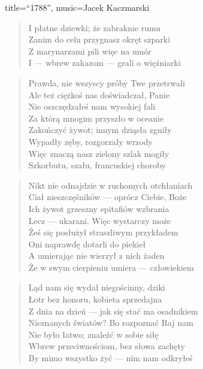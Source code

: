 \begin{song}{title={``1788''}, music={Jacek Kaczmarski}}
\begin{multicols}{2}
\begin{verse}
        I płatne dziewki; że zabraknie rumu \\
        Zanim do celu przygnasz okręt szparki \\
        Z marynarzami pili więc na umór \\
        I --- wbrew zakazom --- grali o więźniarki
    \end{verse}
    \vfill\null\columnbreak{}
    \begin{verse}
        Prawda, nie wszyscy próby Twe przetrwali \\
        Ale też ciężkoś nas doświadczał, Panie \\
        Nie oszczędzałeś nam wysokiej fali \\ 
        Za którą mnogim przyszło w oceanie \\
        Zakończyć żywot; innym dziąsła zgniły \\
        Wypadły zęby, rozgorzały wrzody \\ 
        Więc znaczą nasz zielony szlak mogiły \\
        Szkorbutu, szału, francuskiej choroby
    \end{verse}
    \begin{verse}
        Nikt nie odnajdzie w ruchomych otchłaniach \\
        Ciał nieszczęśników --- oprócz Ciebie, Boże \\
        Ich żywot grzeszny epitafiów wzbrania \\
        Lecz --- ukarani. Więc wystarczy może \\ 
        Żeś się posłużył straszliwym przykładem \\
        Oni naprawdę dotarli do piekieł \\
        A umierając nie wierzył z nich żaden \\
        Że w swym cierpieniu umiera --- człowiekiem
    \end{verse}
    \begin{verse}
        Ląd nam się wydał niegościnny, dziki \\
        Łotr bez honoru, kobieta sprzedajna \\
        Z dnia na dzień --- jak się stać ma osadnikiem \\
        Nieznanych światów? Bo rozpoznać Raj nam \\
        Nie było łatwo; znaleźć w sobie siłę \\
        Wbrew przeciwnościom, bez słowa zachęty \\
        By mimo wszystko żyć --- nim nam odkryłeś \\ 

\end{verse}
\end{multicols}
\end{song}
